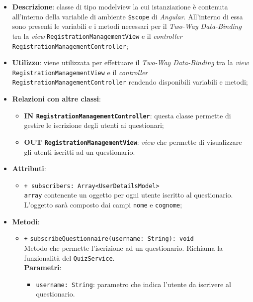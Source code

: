 	\begin{itemize}
		\item \textbf{Descrizione}: classe di tipo modelview la cui istanziazione è contenuta all'interno della variabile di ambiente \texttt{\$scope} di \textit{Angular}. All'interno di essa sono presenti le variabili e i metodi necessari per il \textit{Two-Way Data-Binding} tra la \textit{view} \texttt{RegistrationManagementView} e il \textit{controller} \texttt{RegistrationManagementController};
		\item \textbf{Utilizzo}: viene utilizzata per effettuare il \textit{Two-Way Data-Binding} tra la \textit{view}\\ \texttt{RegistrationManagementView} e il \textit{controller} \texttt{RegistrationManagementController} rendendo disponibili variabili e metodi;
		\item \textbf{Relazioni con altre classi}: 
		\begin{itemize}
			\item \textbf{IN \texttt{RegistrationManagementController}}: questa classe permette di gestire le iscrizione degli utenti ai questionari;
			\item \textbf{OUT \texttt{RegistrationManagementView}}: \textit{view} che permette di visualizzare gli utenti iscritti ad un questionario.
		\end{itemize}
		\item \textbf{Attributi}: 
		\begin{itemize}
			\item \texttt{+ subscribers: Array<UserDetailsModel>} \\ \texttt{array} contenente un oggetto per ogni utente iscritto al questionario. L'oggetto sarà composto dai campi \texttt{nome} e \texttt{cognome};
		\end{itemize}
		\item \textbf{Metodi}: 
		\begin{itemize}
			\item \texttt{+} \texttt{subscribeQuestionnaire(username: String): void} \\ Metodo che permette l'iscrizione ad un questionario. Richiama la funzionalità del \texttt{QuizService}. \\
			\textbf{Parametri}:
			\begin{itemize}
				\item \texttt{username: String}: parametro che indica l'utente da iscrivere al questionario.
			\end{itemize}

\end{itemize}
\end{itemize}
